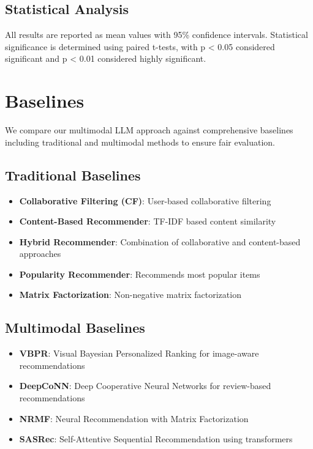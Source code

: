 \subsection{Statistical Analysis}
All results are reported as mean values with 95\% confidence intervals. Statistical significance is determined using paired t-tests, with p < 0.05 considered significant and p < 0.01 considered highly significant.

\section{Baselines}

We compare our multimodal LLM approach against comprehensive baselines including traditional and multimodal methods to ensure fair evaluation.

\subsection{Traditional Baselines}
\begin{itemize}
    \item \textbf{Collaborative Filtering (CF)}: User-based collaborative filtering
    \item \textbf{Content-Based Recommender}: TF-IDF based content similarity
    \item \textbf{Hybrid Recommender}: Combination of collaborative and content-based approaches
    \item \textbf{Popularity Recommender}: Recommends most popular items
    \item \textbf{Matrix Factorization}: Non-negative matrix factorization
\end{itemize}

\subsection{Multimodal Baselines}
\begin{itemize}
    \item \textbf{VBPR}: Visual Bayesian Personalized Ranking for image-aware recommendations
    \item \textbf{DeepCoNN}: Deep Cooperative Neural Networks for review-based recommendations
    \item \textbf{NRMF}: Neural Recommendation with Matrix Factorization
    \item \textbf{SASRec}: Self-Attentive Sequential Recommendation using transformers
\end{itemize}

